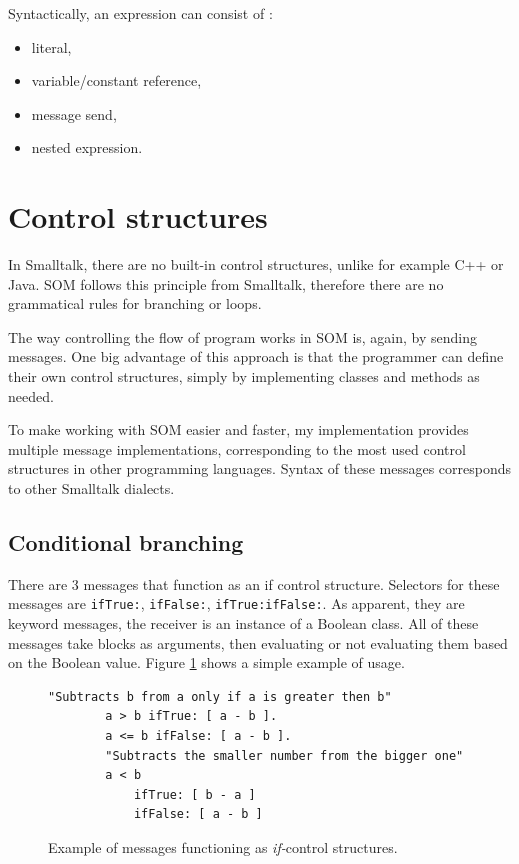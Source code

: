 \documentclass[thesis=M,english]{FITthesis}[2019/12/23]
\begin{document}
Syntactically, an expression can consist of \cite{smalltalk-essentials}:
\begin{itemize}
	\item literal,
	\item variable/constant reference,
	\item message send,
	\item nested expression.
\end{itemize}

\section{Control structures}
In Smalltalk, there are no built-in control structures, unlike for example C++ or Java. SOM follows this principle
from Smalltalk, therefore there are no grammatical rules for branching or loops.

The way controlling the flow of program works in SOM is, again, by sending messages. One big advantage of this 
approach is that the programmer can define their own control structures, simply by implementing classes and
methods as needed.

To make working with SOM easier and faster, my implementation provides multiple message implementations, 
corresponding to the most used control structures in other programming languages. Syntax of these messages
corresponds to other Smalltalk dialects.

\subsection{Conditional branching}
There are 3 messages that function as an if control structure. Selectors for these messages are \texttt{ifTrue:},
\texttt{ifFalse:}, \texttt{ifTrue:ifFalse:}. As apparent, they are keyword messages, the receiver is an instance of
a Boolean class. All of these messages take blocks as arguments, then evaluating or not evaluating them based on
the Boolean value. Figure \ref{lst-if-control} shows a simple example of usage.

\begin{figure}[h!]
	\begin{lstlisting}[language=Smalltalk]
		"Subtracts b from a only if a is greater then b"
		a > b ifTrue: [ a - b ].
		a <= b ifFalse: [ a - b ].
		"Subtracts the smaller number from the bigger one"
		a < b
			ifTrue: [ b - a ]
			ifFalse: [ a - b ]
	\end{lstlisting}
	\caption{Example of messages functioning as \textit{if-}control structures.}
	\label{lst-if-control}
\end{figure}
\end{document}
